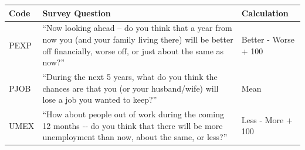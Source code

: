 \documentclass[]{book}
\theoremstyle{definition}
\theoremstyle{definition}
\theoremstyle{remark}
\begin{document}
\begin{longtable}[]{@{}lll@{}}
\toprule
\begin{minipage}[b]{0.09\columnwidth}\raggedright\strut
Code\strut
\end{minipage} & \begin{minipage}[b]{0.28\columnwidth}\raggedright\strut
Survey Question\strut
\end{minipage} & \begin{minipage}[b]{0.20\columnwidth}\raggedright\strut
Calculation\strut
\end{minipage}\tabularnewline
\midrule
\endhead
\begin{minipage}[t]{0.09\columnwidth}\raggedright\strut
PEXP\strut
\end{minipage} & \begin{minipage}[t]{0.28\columnwidth}\raggedright\strut
``Now looking ahead -- do you think that a year from now you (and your
family living there) will be better off financially, worse off, or just
about the same as now?''\strut
\end{minipage} & \begin{minipage}[t]{0.20\columnwidth}\raggedright\strut
Better - Worse + 100\strut
\end{minipage}\tabularnewline
\begin{minipage}[t]{0.09\columnwidth}\raggedright\strut
PJOB\strut
\end{minipage} & \begin{minipage}[t]{0.28\columnwidth}\raggedright\strut
``During the next 5 years, what do you think the chances are that you
(or your husband/wife) will lose a job you wanted to keep?''\strut
\end{minipage} & \begin{minipage}[t]{0.20\columnwidth}\raggedright\strut
Mean\strut
\end{minipage}\tabularnewline
\begin{minipage}[t]{0.09\columnwidth}\raggedright\strut
UMEX\strut
\end{minipage} & \begin{minipage}[t]{0.28\columnwidth}\raggedright\strut
``How about people out of work during the coming 12 months ‐‐ do you
think that there will be more unemployment than now, about the same, or
less?''\strut
\end{minipage} & \begin{minipage}[t]{0.20\columnwidth}\raggedright\strut
Less - More + 100\strut
\end{minipage}\tabularnewline
\bottomrule
\end{longtable}
\end{document}
